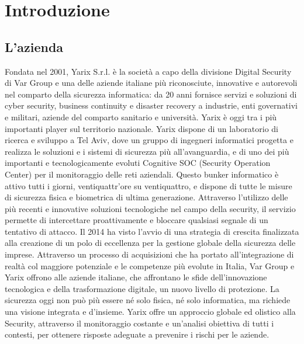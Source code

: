 
\chapter{Introduzione}
\label{cap:introduzione}

\newline{}

\section{L'azienda}

Fondata nel 2001, Yarix S.r.l. è la società a capo della divisione Digital Security di Var Group e una delle aziende italiane più riconosciute, innovative e autorevoli nel comparto della sicurezza informatica: da 20 anni fornisce servizi e soluzioni di cyber security, business continuity e disaster recovery a industrie, enti governativi e militari, aziende del comparto sanitario e università. Yarix è oggi tra i più importanti player sul territorio nazionale.\newline{}
Yarix dispone di un laboratorio di ricerca e sviluppo a Tel Aviv, dove un gruppo di ingegneri informatici progetta e realizza le soluzioni e i sistemi di sicurezza più all’avanguardia, e di uno dei più importanti e tecnologicamente evoluti Cognitive SOC (Security Operation Center) per il monitoraggio delle reti aziendali. Questo bunker informatico è attivo tutti i giorni, ventiquattr’ore su ventiquattro, e dispone di tutte le misure di sicurezza fisica e biometrica di ultima generazione. Attraverso l’utilizzo delle più recenti e innovative soluzioni tecnologiche nel campo della security, il servizio permette di intercettare proattivamente e bloccare qualsiasi segnale di un tentativo di attacco.\newline{}
Il 2014 ha visto l’avvio di una strategia di crescita finalizzata alla creazione di un polo di eccellenza per la gestione globale della sicurezza delle imprese. Attraverso un processo di acquisizioni che ha portato all’integrazione di realtà col maggiore potenziale e le competenze più evolute in Italia, Var Group e Yarix offrono alle aziende italiane, che affrontano le sfide dell’innovazione tecnologica e della trasformazione digitale, un nuovo livello di protezione. La sicurezza oggi non può più essere né solo fisica, né solo informatica, ma richiede una visione integrata e d’insieme. Yarix offre un approccio globale ed olistico alla Security, attraverso il monitoraggio costante e un’analisi obiettiva di tutti i contesti, per ottenere risposte adeguate a prevenire i rischi per le aziende.

